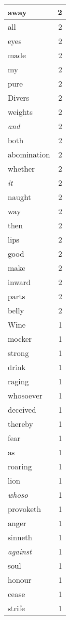 \begin{center}
\begin{longtable}{l|r}
away & 2\\ \hline 
all & 2\\ \hline 
eyes & 2\\ \hline 
made & 2\\ \hline 
my & 2\\ \hline 
pure & 2\\ \hline 
Divers & 2\\ \hline 
weights & 2\\ \hline 
\emph{and} & 2\\ \hline 
both & 2\\ \hline 
abomination & 2\\ \hline 
whether & 2\\ \hline 
\emph{it} & 2\\ \hline 
naught & 2\\ \hline 
way & 2\\ \hline 
then & 2\\ \hline 
lips & 2\\ \hline 
good & 2\\ \hline 
make & 2\\ \hline 
inward & 2\\ \hline 
parts & 2\\ \hline 
belly & 2\\ \hline 
Wine & 1\\ \hline 
mocker & 1\\ \hline 
strong & 1\\ \hline 
drink & 1\\ \hline 
raging & 1\\ \hline 
whosoever & 1\\ \hline 
deceived & 1\\ \hline 
thereby & 1\\ \hline 
fear & 1\\ \hline 
as & 1\\ \hline 
roaring & 1\\ \hline 
lion & 1\\ \hline 
\emph{whoso} & 1\\ \hline 
provoketh & 1\\ \hline 
anger & 1\\ \hline 
sinneth & 1\\ \hline 
\emph{against} & 1\\ \hline 
soul & 1\\ \hline 
honour & 1\\ \hline 
cease & 1\\ \hline 
strife & 1\\ \hline 

\end{longtable}
\end{center}
